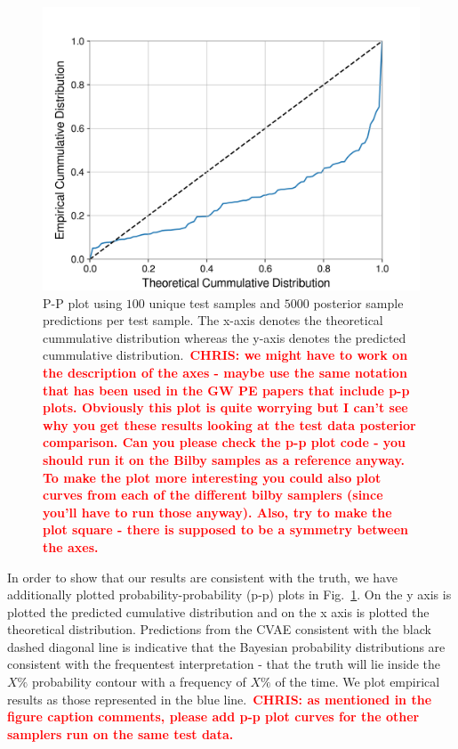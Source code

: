 \documentclass[%
showpacs,
 amsmath,amssymb,
 aps,
 twocolumn,
 prl,
 reprint,
floatfix,
]{revtex4-1}
\newcommand{\chris}[1]{\textbf{\textcolor{red}{CHRIS: #1}}}
\begin{document}
%
%
\begin{figure}
    \includegraphics[width=\columnwidth]{images/latest_pp_plot.png}
    \caption{\label{fig:pp_plot} P-P plot using $100$ unique test samples and
$5000$ posterior sample predictions per test sample.  The x-axis denotes the
theoretical cummulative distribution whereas the y-axis denotes the predicted
cummulative distribution.~\chris{we might have to work on the description of
the axes - maybe use the same notation that has been used in the GW PE papers
that include p-p plots. Obviously this plot is quite worrying but I can't see
why you get these results looking at the test data posterior comparison. Can
you please check the p-p plot code - you should run it on the Bilby samples as
a reference anyway. To make the plot more interesting you could also plot
curves from each of the different bilby samplers (since you'll have to run
those anyway). Also, try to make the plot square - there is supposed to be a
symmetry between the axes.}} 
\end{figure}
%
In order to show that our results are consistent with the truth, we have
additionally plotted probability-probability (p-p) plots in
Fig.~\ref{fig:pp_plot}. On the y axis is plotted the predicted cumulative
distribution and on the x axis is plotted the theoretical distribution.
Predictions from the \ac{CVAE} consistent with the black dashed diagonal 
line is indicative that the Bayesian probability distributions are 
consistent with the frequentest interpretation - that the truth will 
lie inside the $X\%$ probability contour with a frequency of $X\%$ of the time.  We plot empirical results as those represented in the blue line.~\chris{as mentioned in the figure caption comments, please add p-p plot
curves for the other samplers run on the same test data.} 
\end{document}
